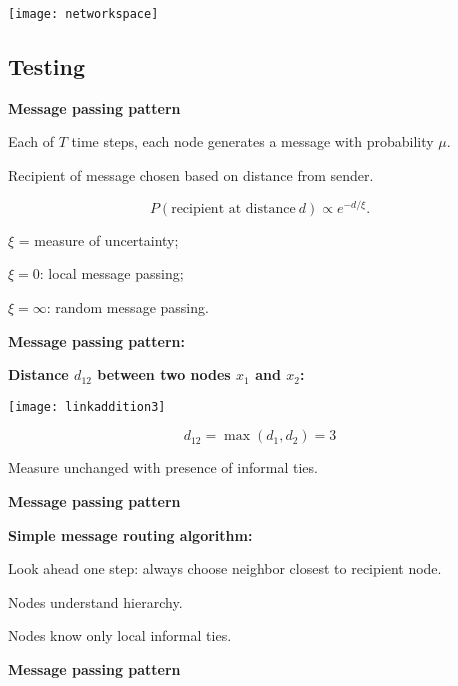   \vfill
  \begin{center}
    \texttt{[image: networkspace]}
  \end{center}
  \vfill




\subsection{Testing}

  \textbf{Message passing pattern}

  
  
    Each of $T$ time steps,  each node generates a message with probability $\mu$.
   
    Recipient of message chosen based on distance from sender.
   
    $$
    P(\mbox{recipient at distance}\ d) \propto e^{-d/\xi}.
    $$
  
  
   
    $\xi$ = measure of uncertainty;
   
    $\xi=0$: local message passing;
    
    $\xi=\infty$: random message passing.
  

  \textbf{Message passing pattern:}

  \textbf{Distance $d_{12}$ between two nodes $x_1$ and $x_2$:}
    \bigskip
           
      \texttt{[image: linkaddition3]}
       
      $$
      d_{12} = \max(d_1,d_2) =3
      $$
        \bigskip
        
     
      Measure unchanged with presence of informal ties.
    
  

  \textbf{Message passing pattern}

  \textbf{Simple message routing algorithm:} 
    
    
      Look ahead one step:
      always choose neighbor closest to recipient node.
    
      
       
        Nodes understand hierarchy.
       
        Nodes know only local informal ties.
      
    
  



  \textbf{Message passing pattern}

